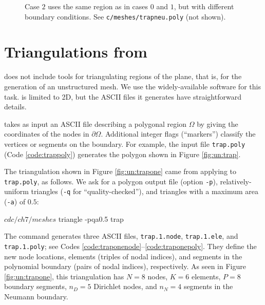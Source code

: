 \begin{figure}

\caption{Case $2$ uses the same region as in cases $0$ and $1$, but with different boundary conditions.  See \texttt{c/\CODELOC meshes/trapneu.poly} (not shown).}
\label{fig:un:trapneu}
\end{figure}


\section{Triangulations from \Triangle}

\PETSc does not include tools for triangulating regions of the plane, that is, for the generation of an unstructured mesh.  We use the widely-available \Triangle{} software \citep{Shewchuk1996} for this task.  \Triangle is limited to 2D, but the ASCII files it generates have straightforward details.


\Triangle takes as input an ASCII file describing a polygonal region $\Omega$ by giving the coordinates of the nodes in $\partial \Omega$.  Additional integer flags (``markers'') classify the vertices or segments on the boundary.  For example, the input file \texttt{trap.poly} (Code \ref{code:trappoly}) generates the polygon shown in Figure \ref{fig:un:trap}.

The triangulation shown in Figure \ref{fig:un:trapone} came from applying \Triangle to \texttt{trap.poly}, as follows.  We ask for a polygon output file (option \texttt{-p}), relatively-uniform triangles (\texttt{-q} for ``quality-checked''), and triangles with a maximum area (\texttt{-a}) of $0.5$:
\begin{cline}
$ cd c/ch7/meshes
$ triangle -pqa0.5 trap
\end{cline}
The command generates three ASCII files, \texttt{trap.1.node}, \texttt{trap.1.ele}, and \texttt{trap.1.poly}; see Codes \ref{code:traponenode}--\ref{code:traponepoly}.  They define the new node locations, elements (triples of nodal indices), and segments in the polynomial boundary (pairs of nodal indices), respectively.  As seen in Figure \ref{fig:un:trapone}, this triangulation has $N=8$ nodes, $K=6$ elements, $P=8$ boundary segments, $n_D=5$ Dirichlet nodes, and $n_N=4$ segments in the Neumann boundary.


